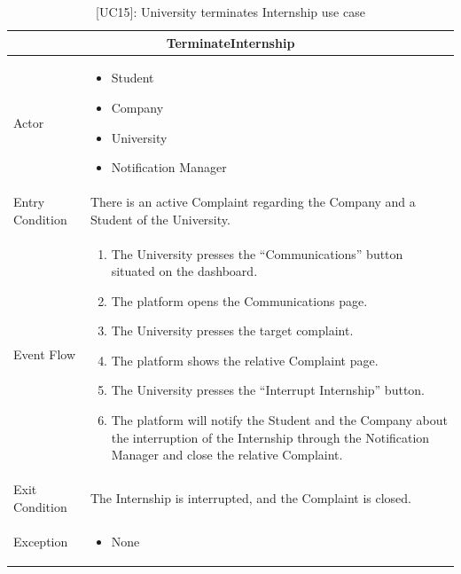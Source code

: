 \begin{table}[H]
    \centering
    \begin{tabular}{|p{3cm}|p{12cm}|}
    \hline
    \multicolumn{2}{|c|}{\textbf{TerminateInternship}} \\ \hline
    Actor & 
    \begin{itemize}
        \item Student
        \item Company
        \item University
        \item Notification Manager
    \end{itemize}\\ \hline
    Entry Condition & There is an active Complaint regarding the Company and a Student of the University. \\ \hline
    Event Flow & 
    \begin{enumerate}         
        \item The University presses the “Communications” button situated on the dashboard.
        \item The platform opens the Communications page.
        \item The University presses the target complaint.
        \item The platform shows the relative Complaint page.
        \item The University presses the “Interrupt Internship” button.
        \item The platform will notify the Student and the Company about the interruption of the Internship through the Notification Manager and close the relative Complaint.
    \end{enumerate} \\ \hline
    Exit Condition & The Internship is interrupted, and the Complaint is closed. \\ \hline
    Exception & 
    \begin{itemize}         
        \item None
    \end{itemize} \\ \hline  
    \end{tabular}
    \caption{[UC15]: University terminates Internship use case}
    \label{tab:UC15}
\end{table}


